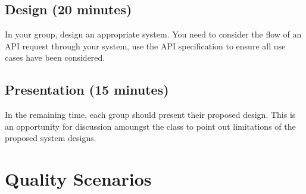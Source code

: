 \documentclass{csse4400}
\begin{document}
\subsection*{Design (20 minutes)}

In your group, design an appropriate system.
You need to consider the flow of an API request through your system,
use the API specification to ensure all use cases have been considered.


\subsection*{Presentation (15 minutes)}

In the remaining time,
each group should present their proposed design.
This is an opportunity for discussion amoungst the class to point out limitations of the proposed system designs.

\section{Quality Scenarios}\label{sec:scenarios}
\end{document}
